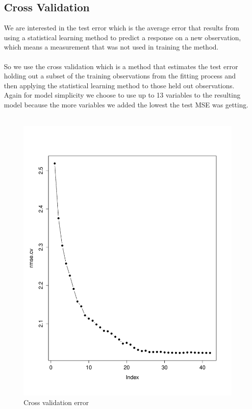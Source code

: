 \documentclass{article}
\begin{document}
\subsection{Cross Validation}
We are interested in the test error which is the average error that results from using a statistical learning method to predict a response on a new observation, which means a measurement that was not used in training the method. 
\\\\
So we use the cross validation which is a method that estimates the test error holding out a subset  of the training observations from the fitting process and then applying the statistical learning method to those held out observations. Again for model simplicity we choose to use up to 13 variables to the resulting model because the more variables we added the lowest the test MSE was getting.
\\\\
\begin{figure}[H]
    \centering
   \includegraphics[scale=0.3]{CROSS_VALIDATION_MSE_PLOT.pdf}
    \caption{Cross validation error}
    \label{CrossValidationError}
\end{figure}
\end{document}
